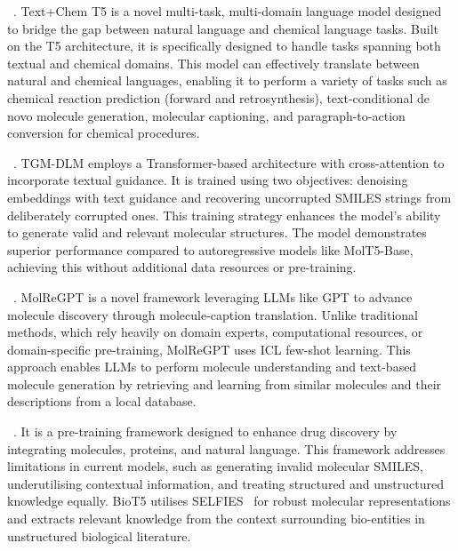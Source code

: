 ~\cite{CGBWLM23}. 
Text+Chem T5 is a novel multi-task, multi-domain language model designed to bridge the gap between natural language and chemical language tasks. 
Built on the T5 architecture, it is specifically designed to handle tasks spanning both textual and chemical domains. 
This model can effectively translate between natural and chemical languages, enabling it to perform a variety of tasks such as chemical reaction prediction (forward and retrosynthesis), text-conditional de novo molecule generation, molecular captioning, and paragraph-to-action conversion for chemical procedures.

~\cite{GLWW24}. 
TGM-DLM employs a Transformer-based architecture with cross-attention to incorporate textual guidance. 
It is trained using two objectives: denoising embeddings with text guidance and recovering uncorrupted SMILES strings from deliberately corrupted ones. 
This training strategy enhances the model's ability to generate valid and relevant molecular structures.
% 
The model demonstrates superior performance compared to autoregressive models like MolT5-Base, achieving this without additional data resources or pre-training. 

~\cite{LLFWLTL24}. 
MolReGPT is a novel framework leveraging LLMs like GPT to advance molecule discovery through molecule-caption translation. 
Unlike traditional methods, which rely heavily on domain experts, computational resources, or domain-specific pre-training, MolReGPT uses ICL few-shot learning. 
This approach enables LLMs to perform molecule understanding and text-based molecule generation by retrieving and learning from similar molecules and their descriptions from a local database. 



~\cite{PZZWGWXY23}.
It is a pre-training framework designed to enhance drug discovery by integrating molecules, proteins, and natural language. 
This framework addresses limitations in current models, such as generating invalid molecular SMILES, underutilising contextual information, and treating structured and unstructured knowledge equally. 
BioT5 utilises SELFIES~\cite{KHNFG20} for robust molecular representations and extracts relevant knowledge from the context surrounding bio-entities in unstructured biological literature. 


